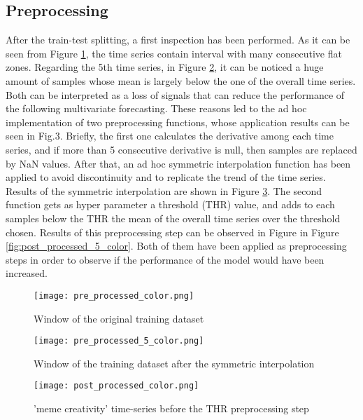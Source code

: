 \documentclass[conference]{IEEEtran}
\begin{document}
\subsection{Preprocessing}
    After the train-test splitting, a first inspection has been performed. As it can be seen from Figure \ref{fig:preprocessed_range},
    the time series contain interval with many consecutive flat zones. Regarding the 5th time series, in Figure \ref{fig:pre_processed_5_color}, 
    it can be noticed a huge amount of samples whose mean is largely below the one of the overall time series. Both can be interpreted as a loss of signals that can reduce the performance 
    of the following multivariate forecasting. These reasons led to the ad hoc implementation of two preprocessing functions, whose application results
    can be seen in Fig.3.     Briefly, the first one calculates the derivative among each time series, and if more than 5 consecutive derivative is null, 
    then samples are replaced by NaN values. After that, an ad hoc  symmetric interpolation function has been applied to avoid discontinuity and to replicate 
    the trend of the time series. Results of the symmetric interpolation are shown in Figure \ref{fig:postprocessed_range}.
    The second function gets as hyper parameter a threshold (THR) value, and adds to each samples below the THR the mean of the overall time series over the 
    threshold chosen. Results of this preprocessing step can be observed in Figure in Figure \ref{fig:post_processed_5_color}.
    Both of them have been applied as preprocessing steps in order to observe if the performance of the model would have been increased. 
    \begin{figure}[]
        \texttt{[image: pre\_processed\_color.png]}
        \caption{Window of the original training dataset}
        \label{fig:preprocessed_range}
    \end{figure}

    \begin{figure}[]
        \texttt{[image: pre\_processed\_5\_color.png]}
        \caption{Window of the training dataset after the symmetric interpolation}
        \label{fig:pre_processed_5_color}
    \end{figure}

    \begin{figure}[]
        \texttt{[image: post\_processed\_color.png]}
        \caption{'meme creativity' time-series before the THR preprocessing step}
        \label{fig:postprocessed_range}
    \end{figure}
\end{document}

